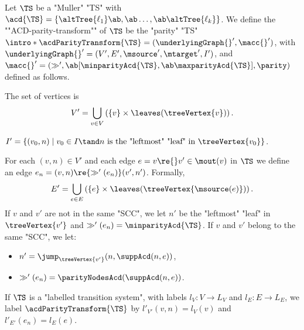 \documentclass{theoretics}
\begin{document}
\begin{definition}\label{def:parityTransformationACD}
	 Let $\TS$ be a "Muller" "TS" with  $\acd{\TS} = \{\altTree{\ell_1}\ab,\ab \dots,\ab \altTree{\ell_k}\}$. 
	 \AP We define the ""ACD-parity-transform"" of $\TS$  be the "parity" "TS" $\intro*\acdParityTransform{\TS} = (\underlyingGraph{}', \macc{}')$, with $\underlyingGraph{}' = (V', E', \msource', \mtarget', I')$, and $\macc{}' = (\gg', \ab[\minparityAcd{\TS},\ab \maxparityAcd{\TS}], \parity)$ defined as follows.
	 \begin{description}
	 	\setlength\itemsep{2mm}
	 	\item[Vertices.] The set of vertices is \[V'= \bigcup_{v\in V} \left( \{v\}\times \leaves(\treeVertex{v}) \right).\]
	 	
	 	\item[Initial vertices.] %
	 	$I' = \{ (v_0, n) \mid v_0\in I \tand n \text{ is the "leftmost" "leaf" in } \treeVertex{v_0} \}$.
	 	
	 	\item[Edges and output colours.] For each $(v,n)\in V'$ and each edge $e = v\re{}v'\in \mout(v)$ in $\TS$ we define an edge $e_n = (v,n)\re{\gg'(e_n)} (v',n')$. Formally, 
	 	\[E'= \bigcup_{e\in E} \left( \{e\}\times \leaves(\treeVertex{\msource(e)}) \right).\]
	 	 If $v$ and $v'$ are not in the same "SCC", we let $n'$ be the "leftmost" "leaf" in $\treeVertex{v'}$ and $\gg'(e_n) = \minparityAcd{\TS}$.\footnotemark{} If $v$ and $v'$ belong to the same "SCC", we let:
	 	\begin{itemize}
	 		\item $n' = \jump_{\treeVertex{v'}}(n, \suppAcd(n,e))$,
	 		\item $\gg'(e_n) = \parityNodesAcd(\suppAcd(n,e))$.
	 	\end{itemize}
 	
 		\item[Labellings.]If $\TS$ is a "labelled transition system", with labels $l_V\colon V \to L_V$ and $l_E\colon E \to L_E$, we label $\acdParityTransform{\TS}$ by $l'_{V'}(v,n) = l_V(v)$ and $l'_{E'}(e_n) = l_E(e)$.
	 \end{description}
\end{definition}
\end{document}
